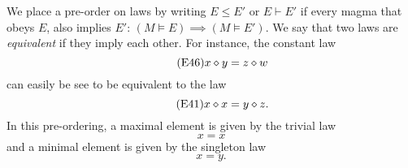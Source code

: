 We place a pre-order on laws by writing $E \leq E'$ or $E \vdash E'$ if every magma that obeys $E$, also implies $E'$: $(M \models E) \implies (M \models E')$.  We say that two laws are \emph{equivalent} if they imply each other.  For instance, the constant law
\begin{equation}\label{eq46}\tag{E46}
x \diamond y = z \diamond w
\end{equation}
can easily be see to be equivalent to the law
\begin{equation}\label{eq41}\tag{E41}
x \diamond x = y \diamond z.
\end{equation}
In this pre-ordering, a maximal element is given by the trivial law
\begin{equation}\label{eq1}\tag{E1}
x = x
\end{equation}
and a minimal element is given by the singleton law
\begin{equation}\label{eq2}\tag{E2}
x = y.
\end{equation}

